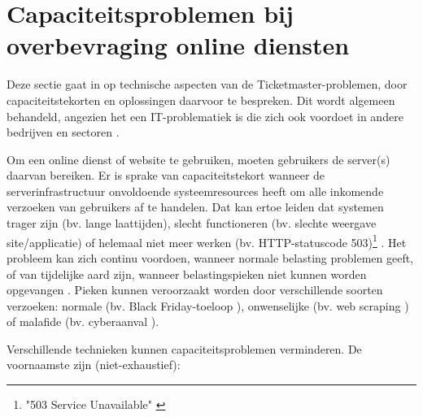 
\section{Capaciteitsproblemen bij overbevraging online diensten}

Deze sectie gaat in op technische aspecten van de
Ticketmaster-problemen,
door capaciteitstekorten en oplossingen daarvoor te bespreken.
Dit wordt algemeen behandeld,
angezien het een IT-problematiek is 
die zich ook voordoet in andere bedrijven en
sectoren \cite{warren2023chatgpt, warren2020discord, reuters2023what}.

Om een online dienst of website te gebruiken, moeten gebruikers de
server(s) daarvan bereiken. Er is sprake van
capaciteitstekort wanneer de serverinfrastructuur onvoldoende systeemresources
heeft om alle inkomende verzoeken van gebruikers af te handelen.
Dat kan ertoe leiden dat systemen trager zijn (bv. lange laattijden),
slecht functioneren (bv. slechte weergave site/applicatie) of
helemaal niet meer werken (bv. HTTP-statuscode
503)\footnote{"503 Service Unavailable" \cite{fielding2022http}}
\cite{guitart2010survey, guitart2007designing}.
Het probleem kan zich continu voordoen, wanneer normale belasting problemen
geeft, of van tijdelijke aard zijn, wanneer belastingspieken niet kunnen worden
opgevangen \cite{schroeder2006web}. Pieken kunnen veroorzaakt worden
door verschillende soorten verzoeken:
normale (bv. Black Friday-toeloop \cite{iyer2001overload}),
onwenselijke (bv. web scraping \cite{thelwall2006web}) of
malafide (bv. cyberaanval \cite{loukas2009protection}).

Verschillende technieken kunnen capaciteitsproblemen verminderen.
De voornaamste zijn (niet-exhaustief):

